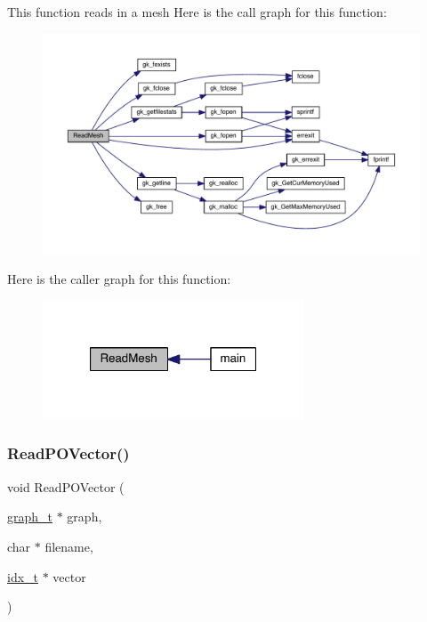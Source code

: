 This function reads in a mesh Here is the call graph for this function\+:\nopagebreak
\begin{figure}[H]
\begin{center}
\leavevmode
\includegraphics[width=350pt]{a00948_aef01a8b2c6432d21be77abeabeeeced8_cgraph}
\end{center}
\end{figure}
Here is the caller graph for this function\+:\nopagebreak
\begin{figure}[H]
\begin{center}
\leavevmode
\includegraphics[width=220pt]{a00948_aef01a8b2c6432d21be77abeabeeeced8_icgraph}
\end{center}
\end{figure}
\mbox{\label{a00948_a65a7c382444e5132dafddb75b6117754}} 
\subsubsection{\texorpdfstring{Read\+P\+O\+Vector()}{ReadPOVector()}}
{\footnotesize\ttfamily void Read\+P\+O\+Vector (\begin{DoxyParamCaption}\item[{\hyperlink{a00734}{graph\+\_\+t} $\ast$}]{graph,  }\item[{char $\ast$}]{filename,  }\item[{\hyperlink{a00876_aaa5262be3e700770163401acb0150f52}{idx\+\_\+t} $\ast$}]{vector }\end{DoxyParamCaption})}

